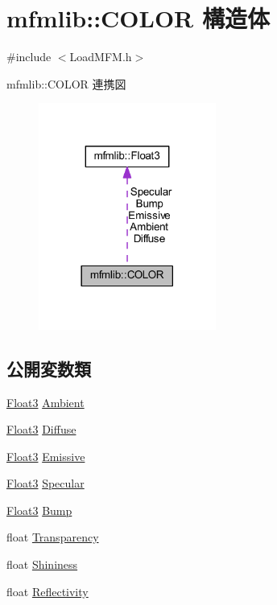\hypertarget{structmfmlib_1_1_c_o_l_o_r}{}\section{mfmlib\+:\+:C\+O\+L\+OR 構造体}
\label{structmfmlib_1_1_c_o_l_o_r}


{\ttfamily \#include $<$Load\+M\+F\+M.\+h$>$}



mfmlib\+:\+:C\+O\+L\+OR 連携図\nopagebreak
\begin{figure}[H]
\begin{center}
\leavevmode
\includegraphics[width=165pt]{structmfmlib_1_1_c_o_l_o_r__coll__graph}
\end{center}
\end{figure}
\subsection*{公開変数類}
\begin{DoxyCompactItemize}
\item 
\mbox{\hyperlink{structmfmlib_1_1_float3}{Float3}} \mbox{\hyperlink{structmfmlib_1_1_c_o_l_o_r_a66a6ab53ba9f59038bb853b5cb2bcee3}{Ambient}}
\item 
\mbox{\hyperlink{structmfmlib_1_1_float3}{Float3}} \mbox{\hyperlink{structmfmlib_1_1_c_o_l_o_r_a1c67c1a239b12b2896e07a19643ecf95}{Diffuse}}
\item 
\mbox{\hyperlink{structmfmlib_1_1_float3}{Float3}} \mbox{\hyperlink{structmfmlib_1_1_c_o_l_o_r_a179a172e0911c311ce7f5292f428897a}{Emissive}}
\item 
\mbox{\hyperlink{structmfmlib_1_1_float3}{Float3}} \mbox{\hyperlink{structmfmlib_1_1_c_o_l_o_r_a6f8590c510c471fb9bfe748c113d86d0}{Specular}}
\item 
\mbox{\hyperlink{structmfmlib_1_1_float3}{Float3}} \mbox{\hyperlink{structmfmlib_1_1_c_o_l_o_r_ac6c7c91adc2d4fafe3ac020ff75c871f}{Bump}}
\item 
float \mbox{\hyperlink{structmfmlib_1_1_c_o_l_o_r_a5b50ad6ab93f151be8466ce16ac59e97}{Transparency}}
\item 
float \mbox{\hyperlink{structmfmlib_1_1_c_o_l_o_r_ae5cd2d46dcc9798ded9ecc7f3617bc40}{Shininess}}
\item 
float \mbox{\hyperlink{structmfmlib_1_1_c_o_l_o_r_a3df7017bc9d137c037452cc338fb2b66}{Reflectivity}}
\end{DoxyCompactItemize}


